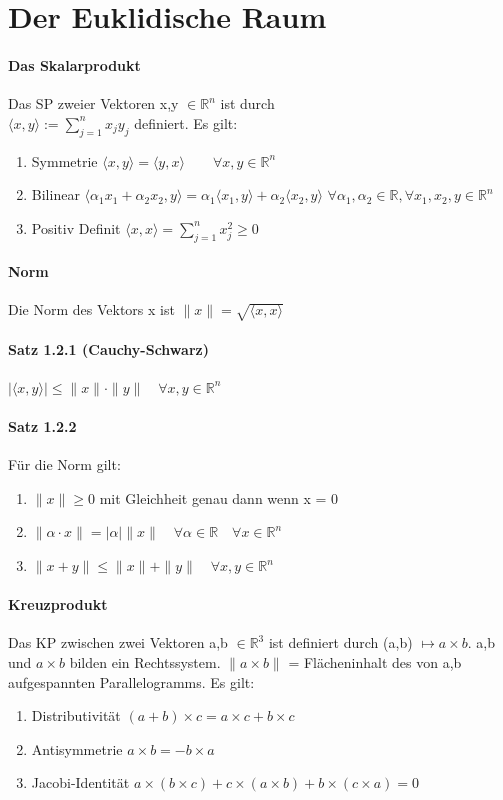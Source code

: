 \documentclass[8pt]{extreport}
\begin{document}
\section{Der Euklidische Raum}
\paragraph{Das Skalarprodukt} Das SP zweier Vektoren x,y $\in \mathbb{R}^n$ ist durch\\ $\langle x,y \rangle := \sum_{j=1}^n x_{j}y_{j}$ definiert. Es gilt:
\begin{enumerate}
\item Symmetrie $\langle x,y \rangle = \langle y,x \rangle \qquad \forall x,y \in \mathbb{R}^n$
\item Bilinear		$\langle \alpha_{1}x_{1} + \alpha_{2}x_{2},y \rangle = \alpha_{1}\langle x_{1},y \rangle + \alpha_{2} \langle x_{2},y \rangle$ $ \forall \alpha_{1},\alpha_{2}\in \mathbb{R}, \forall x_{1},x_{2},y \in \mathbb{R}^n$
\item Positiv Definit $\langle x,x \rangle = \sum_{j=1}^n x_{j}^2 \geq 0$
\end{enumerate}
\paragraph{Norm} Die Norm des Vektors x ist $\|x\| = \sqrt{\langle x,x \rangle}$
\paragraph{Satz 1.2.1 (Cauchy-Schwarz)} $|\langle x,y \rangle | \leq \|x\| \cdot \|y\| \quad \forall x,y \in \mathbb{R}^n$
\paragraph{Satz 1.2.2} Für die Norm gilt:
\begin{enumerate}
\item $\|x\| \geq 0$ mit Gleichheit genau dann wenn x = 0
\item $\| \alpha \cdot x \| = |\alpha| \|x\| \quad \forall \alpha \in \mathbb{R} \quad \forall x \in \mathbb{R}^n$
\item $\|x+y\| \leq \|x\| + \|y\| \quad \forall x,y \in \mathbb{R}^n$
\end{enumerate}
\paragraph{Kreuzprodukt} Das KP zwischen zwei Vektoren a,b $\in \mathbb{R}^3$ ist definiert durch (a,b) $\mapsto a \times b$. a,b und $a \times b$ bilden ein Rechtssystem. $\|a \times b\|$ = Flächeninhalt des von a,b aufgespannten Parallelogramms. Es gilt:
\begin{enumerate}
\item Distributivität $(a+b)\times c = a\times c + b\times c$
\item Antisymmetrie $a \times b = -b\times a$
\item Jacobi-Identität $a\times (b\times c) + c \times(a \times b) + b \times(c\times a) = 0$
\end{enumerate}
\end{document}
